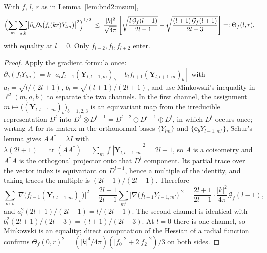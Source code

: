 \begin{lemma}
\label{lem:bnd2:hess}
With $f$, $l$, $r$ as in Lemma~\ref{lem:bnd2:msum},
\begin{equation}
\Bigl(\sum_{m}\sum_{a,b}\bigl|\partial_a\partial_b\bigl(f_l(kr)Y_{lm}\bigr)\bigr|^2
\Bigr)^{1/2}
\;\le\;
\frac{|k|^{2}}{\sqrt{4\pi}}\left[\sqrt{\frac{l\,\mathcal{G}_f(l-1)}{2l-1}}
+ \sqrt{\frac{(l+1)\,\mathcal{G}_f(l+1)}{2l+3}}\right]
=: \Theta_f(l,r),
\label{eq:bnd2:hess}
\end{equation}
with equality at $l = 0$. Only $f_{l-2}, f_l, f_{l+2}$ enter.
\end{lemma}

\begin{proof}
Apply the gradient formula once: $\partial_b(f_lY_{lm}) = k[a_lf_{l-1}
(\mathbf{Y}_{l,l-1,m})_b - b_lf_{l+1}(\mathbf{Y}_{l,l+1,m})_b]$ with
$a_l = \sqrt{l/(2l+1)}$, $b_l = \sqrt{(l+1)/(2l+1)}$, and use Minkowski's inequality in
$\ell^2(m,a,b)$ to separate the two channels. In the first channel, the assignment
$m \mapsto \bigl((\mathbf{Y}_{l,l-1,m})_b\bigr)_{b=1,2,3}$ is an equivariant map from the
irreducible representation $D^l$ into $D^1\otimes D^{l-1} = D^{l-2}\oplus D^{l-1}\oplus
D^{l}$, in which $D^l$ occurs once; writing $A$ for its matrix in the orthonormal bases
$\{Y_{lm}\}$ and $\{\mathbf{e}_b Y_{l-1,m'}\}$, Schur's lemma gives $AA^\dagger = \lambda
I$ with $\lambda(2l+1) = \operatorname{tr}(AA^\dagger) = \sum_m\int|\mathbf{Y}_{l,l-1,m}|^2
= 2l+1$, so $A$ is a coisometry and $A^\dagger A$ is the orthogonal projector onto that
$D^l$ component. Its partial trace over the vector index is equivariant on $D^{l-1}$, hence
a multiple of the identity, and taking traces the multiple is $(2l+1)/(2l-1)$. Therefore
\[
\sum_{m,b}\bigl|\nabla\bigl(f_{l-1}(\mathbf{Y}_{l,l-1,m})_b\bigr)\bigr|^2
= \frac{2l+1}{2l-1}\sum_{m'}\bigl|\nabla\bigl(f_{l-1}Y_{l-1,m'}\bigr)\bigr|^2
= \frac{2l+1}{2l-1}\cdot\frac{|k|^2}{4\pi}\mathcal{G}_f(l-1),
\]
and $a_l^2(2l+1)/(2l-1) = l/(2l-1)$. The second channel is identical with
$b_l^2(2l+1)/(2l+3) = (l+1)/(2l+3)$. At $l = 0$ there is one channel, so Minkowski is an
equality; direct computation of the Hessian of a radial function confirms
$\Theta_f(0,r)^2 = (|k|^4/4\pi)(|f_0|^2+2|f_2|^2)/3$ on both sides.
\end{proof}

